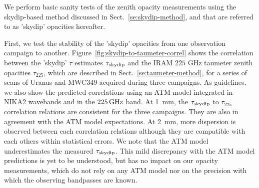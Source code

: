 We perform basic sanity tests of the zenith opacity measurements using
the skydip-based method discussed in Sect.~\ref{se:skydip-method}, and
that are referred to as 'skydip' opacities hereafter.

First, we test the stability of the 'skydip' opacities from one
observation campaign to another.
Figure~\ref{fig:skydip-to-taumeter-correl} shows the
correlation between the 'skydip' $\tau$ estimates $\tau_{\rm{skydip}}$
and the IRAM $225$ GHz taumeter zenith opacities $\tau_{225}$, which
are described in Sect.~\ref{se:taumeter-method}, for a series of scans
of Uranus and MWC349 acquired during three campaigns. As guidelines,
we also show the predicted correlations using an ATM model integrated
in NIKA2 wavebands and in the $225\,\rm{GHz}$ band. At 1~mm, the
$\tau_{\rm{skydip}}$ to $\tau_{225}$ correlation relations are
consistent for the three campaigns. They are
also in agreement with the ATM model expectations. At 2~mm, more
dispersion is observed between each correlation relations although
they are compatible with each others within statistical errors.
We note that the ATM model underestimates the
measured $\tau_{\rm{skydip}}$. This mild discrepancy with the
ATM model predictions is yet to be understood, but has no impact on
our opacity measurements, which do not rely on any ATM model nor on
the precision with which the observing bandpasses are known.


